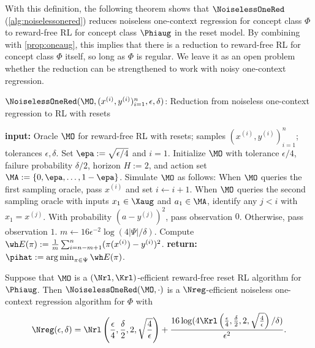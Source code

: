 With this definition, the following theorem shows that $\NoiselessOneRed$ (\cref{alg:noiselessonered}) reduces noiseless one-context regression for concept class $\Phi$ to reward-free RL for concept class $\Phiaug$ in the reset model. By combining with \cref{prop:oneaug}, this implies that there is a reduction to reward-free RL for concept class $\Phi$ itself, so long as $\Phi$ is regular. We leave it as an open problem whether the reduction can be strengthened to work with noisy one-context regression.

\begin{algorithm}[t]
	\caption{$\NoiselessOneRed(\MO, (x^{(i)},y^{(i)})_{i=1}^n,\epsilon,\delta)$: Reduction from noiseless one-context regression to RL with resets}
	\label{alg:noiselessonered}
	\begin{algorithmic}[1]\onehalfspacing
		          \State \textbf{input:} Oracle $\MO$ for reward-free RL with resets; samples $(x^{(i)},y^{(i)})_{i=1}^n$; tolerances $\epsilon,\delta$.
		\State Set $\epa := \sqrt{\epsilon/4}$ and $i = 1$. Initialize $\MO$ with tolerance $\epsilon/4$, failure probability $\delta/2$, horizon $H := 2$, and action set $\MA := \{0,\epa,\dots,1-\epa\}$. Simulate $\MO$ as follows:
        \Repeat
            \State When $\MO$ queries the first sampling oracle, pass $x^{(i)}$ and set $i \gets i+1$.
            \State When $\MO$ queries the second sampling oracle with inputs $x_1\in\Xaug$ and $a_1\in\MA$, identify any $j < i$ with $x_1 = x^{(j)}$. With probability $(a-y^{(j)})^2$, pass observation $0$. Otherwise, pass observation $1$.
        \State $m \gets 16\epsilon^{-2}\log(4|\Psi|/\delta)$.
        \For{$\pi \in \Psi$}
            \State Compute $\wh E(\pi) := \frac{1}{m}\sum_{i=n-m+1}^n (\pi(x^{(i)}) - y^{(i)})^2$.\label{line:noiseless-one-red-emp}
        \EndFor
        \State \textbf{return:} $\pihat := \argmin_{\pi \in \Psi}  \wh E(\pi)$.
	\end{algorithmic}
\end{algorithm}


\begin{proposition}\label{prop:noiseless-onered}
Suppose that $\MO$ is a $(\Nrl,\Krl)$-efficient reward-free reset RL algorithm for $\Phiaug$. Then $\NoiselessOneRed(\MO,\cdot)$ is a $\Nreg$-efficient noiseless one-context regression algorithm for $\Phi$ with
\[\Nreg(\epsilon,\delta) = \Nrl\left(\frac{\epsilon}{4}, \frac{\delta}{2}, 2, \sqrt{\frac{4}{\epsilon}}\right) + \frac{16\log(4\Krl\left(\frac{\epsilon}{4}, \frac{\delta}{2}, 2, \sqrt{\frac{4}{\epsilon}}\right)/\delta)}{\epsilon^2}.\]
\end{proposition}

